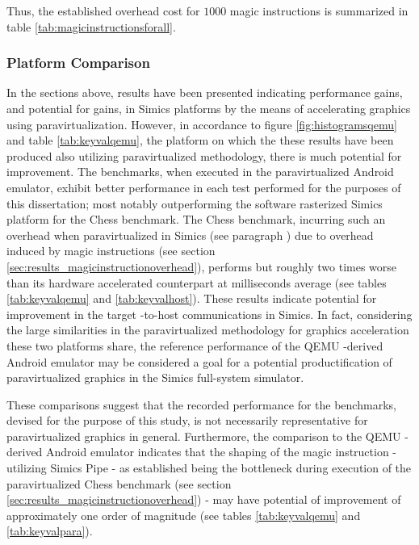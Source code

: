 Thus, the established overhead cost for $1000$ magic instructions is summarized in table \ref{tab:magicinstructionsforall}.

\subsubsection{Platform Comparison}
\label{sec:analysisexperiment_platformcomparison}
In the sections above, results have been presented indicating performance gains, and potential for gains, in Simics platforms by the means of accelerating graphics using paravirtualization.
However, in accordance to figure \ref{fig:histogramsqemu} and table \ref{tab:keyvalqemu}, the platform on which the these results have been produced also utilizing paravirtualized methodology, there is much potential for improvement.
The benchmarks, when executed in the paravirtualized Android emulator, exhibit better performance in each test performed for the purposes of this dissertation; most notably outperforming the software rasterized Simics platform for the Chess benchmark.
The Chess benchmark, incurring such an overhead when paravirtualized in Simics (see paragraph ) due to overhead induced by magic instructions (see section \ref{sec:results_magicinstructionoverhead}), performs but roughly two times worse than its hardware accelerated counterpart at  milliseconds average (see tables \ref{tab:keyvalqemu} and \ref{tab:keyvalhost}).
These results indicate potential for improvement in the target -to-host communications in Simics.
In fact, considering the large similarities in the paravirtualized methodology for graphics acceleration these two platforms share, the reference performance of the QEMU -derived Android emulator may be considered a goal for a potential productification of paravirtualized graphics in the Simics full-system simulator.

These comparisons suggest that the recorded performance for the benchmarks, devised for the purpose of this study, is not necessarily representative for paravirtualized graphics in general.
Furthermore, the comparison to the QEMU -derived Android emulator indicates that the shaping of the magic instruction -utilizing Simics Pipe - as established being the bottleneck during execution of the paravirtualized Chess benchmark (see section \ref{sec:results_magicinstructionoverhead}) - may have potential of improvement of approximately one order of magnitude (see tables \ref{tab:keyvalqemu} and \ref{tab:keyvalpara}).
